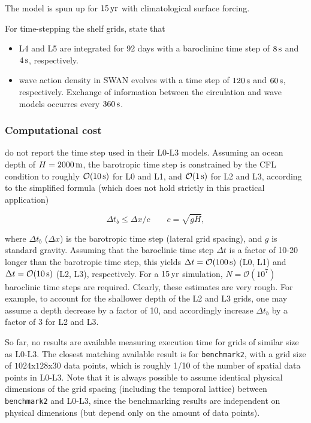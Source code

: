 \documentclass[12pt,a4paper]{article}
\begin{document}
The model is spun up for $15\,\rm yr$ with climatological surface forcing.


For time-stepping the shelf grids, \cite{kumar2015midshelf} state that

\begin{itemize}
	\item L4 and L5 are integrated for 92 days with a baroclininc time step of $8\,\rm s$ and $4\,\rm s$, respectively.
	\item wave action density in SWAN evolves with a time step of $120\,\rm s$ and $60\,\rm s$, respectively. Exchange of information between the circulation and wave models occurres every $360\,\rm s$.
\end{itemize}


\subsubsection{Computational cost}

\cite{kumar2015midshelf} do not report the time step used in their L0-L3 models. Assuming an ocean depth of $H=2000\,\rm m$, the barotropic time step is constrained by the CFL condition to roughly $\mathcal{O}(10\,\rm s)$ for L0 and L1, and $\mathcal{O}(1\,\rm s)$ for L2 and L3, according to the simplified formula (which does not hold strictly in this practical application)

\begin{equation}
\Delta t_{b}\leq\Delta x/c \qquad c=\sqrt{gH},
\end{equation}

where $\Delta t_b$ ($\Delta x$) is the barotropic time step (lateral grid spacing), and $g$ is standard gravity. Assuming that the baroclinic time step $\Delta t$ is a factor of 10-20 longer than the barotropic time step, this yields $\Delta t=\mathcal{O}(100\,\rm s)$ (L0, L1) and $\Delta t= \mathcal{O}(10\,\rm s)$ (L2, L3), respectively. For a $15\,\rm yr$ simulation, $N=\mathcal{O}(10^7)$ baroclinic time steps are required. Clearly, these estimates are very rough. For example, to account for the shallower depth of the L2 and L3 grids,  one may assume a depth decrease by a factor of 10, and accordingly increase $\Delta t_b$ by a factor of 3 for L2 and L3. 

So far, no results are available measuring execution time for grids of similar size as L0-L3. The closest matching available result is for \verb|benchmark2|, with a grid size of $1024$x$128$x$30$ data points, which is roughly 1/10 of the number of spatial data points in L0-L3. Note that it is always possible to assume identical physical dimensions of the grid spacing (including the temporal lattice) between \verb|benchmark2| and L0-L3, since the benchmarking results are independent on physical dimensions (but depend only on the amount of data points).
\end{document}

